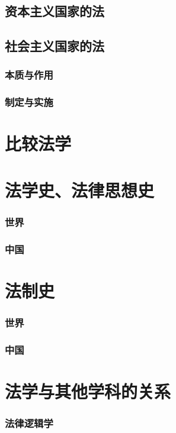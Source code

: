 \documentclass[UTF8]{../ApplicationUniverse}
\begin{document}
    \subsection{资本主义国家的法}
    \subsection{社会主义国家的法}
        \subsubsection{本质与作用}
        \subsubsection{制定与实施}

\section{比较法学}

\section{法学史、法律思想史}
    \subsubsection{世界}
    \subsubsection{中国}

\section{法制史}
    \subsubsection{世界}
    \subsubsection{中国}

\section{法学与其他学科的关系}
        \subsubsection{法律逻辑学}
\end{document}
